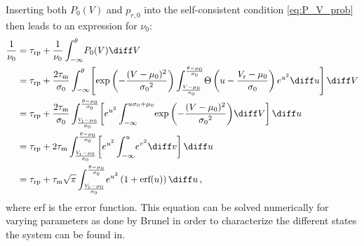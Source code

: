 Inserting both $P_0(V)$ and $p_{r, 0}$ into the self-consistent condition \eqref{eq:P_V_prob}
then leads to an expression for $\nu_0$:
\begin{equation}
    \begin{split}
        \frac{1}{\nu_0} 	
            &= \tau_\text{rp} + \frac{1}{\nu_0} \int_{-\infty}^{\theta} \! P_0(V) \diff V  \\ 
            &= \tau_\text{rp} + \frac{2 \tau_\text{m}}{\sigma_0} 
                \int_{-\infty}^{\theta} \! \left[ 
                    \exp{\left(- \frac{(V - \mu_0)^2}{{\sigma_0}^2} \right)}
                    \int_{\frac{V - \mu_0}{\sigma_0}}^{\frac{\theta - \mu_0}{\sigma_0}} \! 
                        \Theta \left(u - \frac{V_\text{r} - \mu_0}{\sigma_0} \right) e^{u^2} \diff u 
                    \right] \diff V  \\ 
            &= \tau_\text{rp} + \frac{2 \tau_\text{m}}{\sigma_0} 
                \int_{\frac{V_\text{r} - \mu_0}{\sigma_0}}^{\frac{\theta - \mu_0}{\sigma_0}} \! 
                    \left[ 
                        e^{u^2}
                        \int_{-\infty}^{u \sigma_0 + \mu_0} \! 
                        \exp{\left(- \frac{(V - \mu_0)^2}{{\sigma_0}^2} \right)}
                        \diff V
                    \right] \diff u  \\ 
            &= \tau_\text{rp} + 2 \tau_\text{m}
                \int_{\frac{V_\text{r} - \mu_0}{\sigma_0}}^{\frac{\theta - \mu_0}{\sigma_0}} \! 
                    \left[ 
                        e^{u^2}
                        \int_{-\infty}^{u} \! e^{v^2} \diff v
                    \right] \diff u  \\ 
            &= \tau_\text{rp} + \tau_\text{m} \sqrt{\pi}
                \int_{\frac{V_\text{r} - \mu_0}{\sigma_0}}^{\frac{\theta - \mu_0}{\sigma_0}} \! 
                e^{u^2} \left(1 + \text{erf}(u)\right)
                \diff u  \,,
        \label{eq:self_consistency}
    \end{split}
\end{equation}
where $\text{erf}$ is the error function. 
This equation can be solved numerically for varying parameters as done by Brunel in order to 
characterize the different states the system can be found in. 

